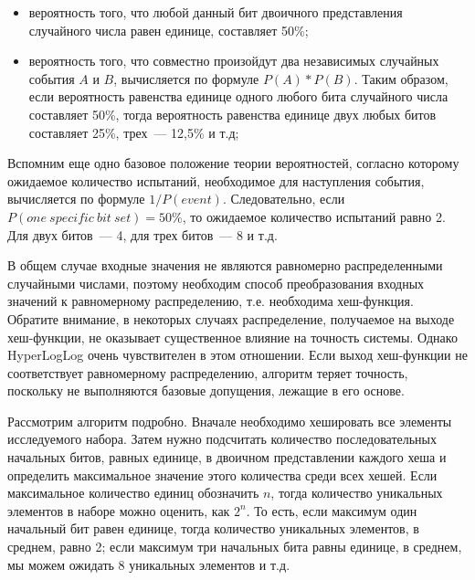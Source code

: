\begin{itemize}
  \item вероятность того, что любой данный бит двоичного представления случайного числа равен единице, составляет 50\%;
  \item вероятность того, что совместно произойдут два независимых случайных события $A$ и $B$, вычисляется по формуле $P(A)*P(B)$. Таким образом, если вероятность равенства единице одного любого бита случайного числа составляет 50\%, тогда вероятность равенства единице двух любых битов составляет 25\%, трех~--- 12,5\% и т.д;
\end{itemize}

Вспомним еще одно базовое положение теории вероятностей, согласно которому ожидаемое количество испытаний, необходимое для наступления события, вычисляется по формуле $1/P(event)$. Следовательно, если $P(one\ specific\ bit\ set) = 50\%$, то ожидаемое количество испытаний равно 2. Для двух битов~--- 4, для трех битов~--- 8 и т.д.

В общем случае входные значения не являются равномерно распределенными случайными числами, поэтому необходим способ преобразования входных значений к равномерному распределению, т.е. необходима хеш-функция. Обратите внимание, в некоторых случаях распределение, получаемое на выходе хеш-функции, не оказывает существенное влияние на точность системы. Однако HyperLogLog очень чувствителен в этом отношении. Если выход хеш-функции не соответствует равномерному распределению, алгоритм теряет точность, поскольку не выполняются базовые допущения, лежащие в его основе.

Рассмотрим алгоритм подробно. Вначале необходимо хешировать все элементы исследуемого набора. Затем нужно подсчитать количество последовательных начальных битов, равных единице, в двоичном представлении каждого хеша и определить максимальное значение этого количества среди всех хешей. Если максимальное количество единиц обозначить $n$, тогда количество уникальных элементов в наборе можно оценить, как $2^n$. То есть, если максимум один начальный бит равен единице, тогда количество уникальных элементов, в среднем, равно 2; если максимум три начальных бита равны единице, в среднем, мы можем ожидать 8 уникальных элементов и т.д.

